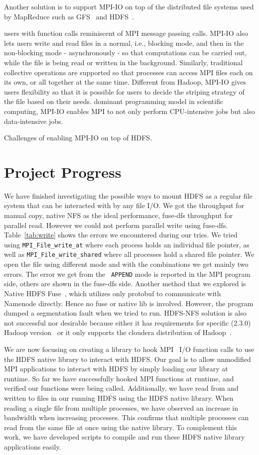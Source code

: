 \documentclass[11pt,titlepage]{article}
\begin{document}
Another solution is to support MPI-IO on top of the distributed file systems
used by MapReduce such as GFS~\cite{} and HDFS~\cite{hdfs}.

users with function calls reminiscent of MPI message passing calls. MPI-IO also
lets users write and read files in a normal, i.e., blocking mode, and then in the
non-blocking mode - asynchronously - so that computations can be carried out,
while the file is being read or written in the background. Similarly,
traditional collective operations are supported so that processes can access
MPI files each on its own, or all together at the same time. 
Different from Hadoop, MPI-IO gives users flexibility so that it is possible for
users to decide the striping strategy of the file based on their needs. 
dominant programming model in scientific computing, MPI-IO enables MPI to not
only perform CPU-intensive jobs but also data-intensive jobs. 

{\color{blue}Challenges of enabling MPI-IO on top of HDFS.}
\section{Project Progress}
We have finished investigating the possible ways to mount HDFS as a regular
file system that can be interacted with by any file I/O. 
We got the throughput for manual copy, native NFS as the ideal performance,
fuse-dfs throughput for parallel read. However we could not perform parallel
write using fuse-dfs. Table~\ref{tab:write} shows the errors we encountered during our
tries. We tried using {\tt MPI\_File\_write\_at} where each process holds an
individual file pointer, as well as {\tt MPI\_File\_write\_shared} where all
processes hold a shared file pointer. We open the file using different mode and
with the combinations we get mainly two errors. The error we get from the {\tt
APPEND} mode is reported in the MPI program side, others are shown in the
fuse-dfs side. Another method that we explored is Native HDFS Fuse~\cite{native},
which utilizes only protobuf to communicate with Namenode directly. Hence no
fuse or native lib is involved. However, the program dumped a segmentation fault
when we tried to run. HDFS-NFS solution is also not successful nor
desirable because either it has requirements for specific (2.3.0) Hadoop
version~\cite{nfs} or it only supports the cloudera distribution of
Hadoop~\cite{proxy}.


We are now focusing on creating a library to 
hook MPI~\cite{mpich} I/O function calls to use the HDFS native library to interact with
HDFS. Our goal is to allow 
unmodified MPI applications to interact with HDFS by simply loading our library
at runtime. 
So far we have successfully hooked MPI functions at runtime, and verified our
functions were being 
called. Additionally, we have read from and written to files in our running HDFS
using the HDFS native 
library. When reading a single file from multiple processes, we have observed an
increase in bandwidth 
when increasing processes. This confirms that multiple processes can read from the
same file at once using 
the native library. To complement this work, we have developed scripts to
compile and run these HDFS 
native library applications easily.
\end{document}
